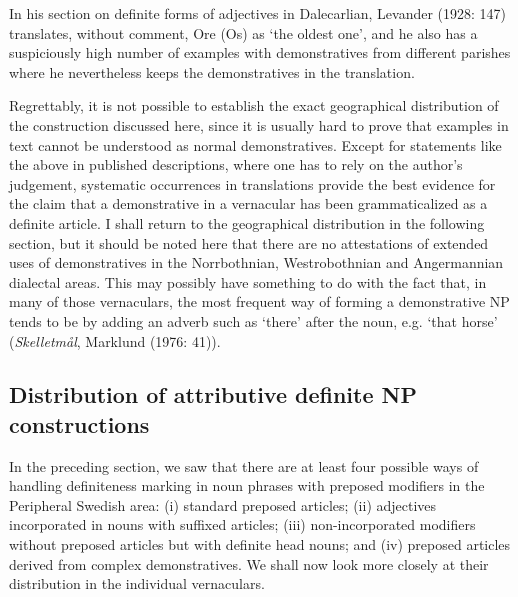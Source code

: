 In his section on definite forms of adjectives in Dalecarlian, Levander (1928: 147) translates, without comment, Ore (Os)  as ‘the oldest one’, and he also has a suspiciously high number of examples with demonstratives from different parishes where he nevertheless keeps the demonstratives in the translation. 

Regrettably, it is not possible to establish the exact geographical distribution of the construction discussed here, since it is usually hard to prove that examples in text cannot be understood as normal demonstratives. Except for statements like the above in published descriptions, where one has to rely on the author’s judgement, systematic occurrences in translations provide the best evidence for the claim that a demonstrative in a vernacular has been grammaticalized as a definite article. I shall return to the geographical distribution in the following section, but it should be noted here that there are no attestations of extended uses of demonstratives in the Norrbothnian, Westrobothnian and Angermannian dialectal areas. This may possibly have something to do with the fact that, in many of those vernaculars, the most frequent way of forming a demonstrative NP tends to be by adding an adverb such as  ‘there’ after the noun, e.g.  ‘that horse’ (\textit{Skelletmål}, Marklund (1976: 41)).

\subsection[Distribution of attributive definite NP constructions]{\rmfamily Distribution of attributive definite NP constructions}
\label{bkm:Ref141070030}%
In the preceding section, we saw that there are at least four possible ways of handling definiteness marking in noun phrases with preposed modifiers in the Peripheral Swedish area: (i) standard preposed articles; (ii) adjectives incorporated in nouns with suffixed articles; (iii) non-incorporated modifiers without preposed articles but with definite head nouns; and (iv) preposed articles derived from complex demonstratives.  We shall now look more closely at their distribution in the individual vernaculars. 


